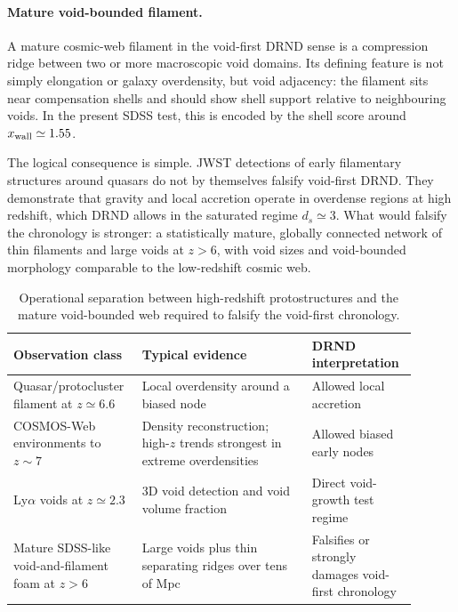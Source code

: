 \documentclass[11pt,a4paper]{article}
\begin{document}
\paragraph{Mature void-bounded filament.}
A mature cosmic-web filament in the void-first DRND sense is a compression ridge between two or more macroscopic void domains. Its defining feature is not simply elongation or galaxy overdensity, but void adjacency: the filament sits near compensation shells and should show shell support relative to neighbouring voids. In the present SDSS test, this is encoded by the shell score around $x_{\rm wall}\simeq1.55$.

The logical consequence is simple. JWST detections of early filamentary structures around quasars do not by themselves falsify void-first DRND. They demonstrate that gravity and local accretion operate in overdense regions at high redshift, which DRND allows in the saturated regime $d_s\simeq3$. What would falsify the chronology is stronger: a statistically mature, globally connected network of thin filaments and large voids at $z>6$, with void sizes and void-bounded morphology comparable to the low-redshift cosmic web.

\begin{table}[H]
\centering
\caption{Operational separation between high-redshift protostructures and the mature void-bounded web required to falsify the void-first chronology.}
\small
\begin{tabular}{p{0.26\linewidth}p{0.40\linewidth}p{0.24\linewidth}}
\toprule
Observation class & Typical evidence & DRND interpretation \\
\midrule
Quasar/protocluster filament at $z\simeq6.6$ & Local overdensity around a biased node \cite{wang2023} & Allowed local accretion \\
COSMOS-Web environments to $z\sim7$ & Density reconstruction; high-$z$ trends strongest in extreme overdensities \cite{hatamnia2026} & Allowed biased early nodes \\
Ly$\alpha$ voids at $z\simeq2.3$ & 3D void detection and void volume fraction \cite{krolewski2018} & Direct void-growth test regime \\
Mature SDSS-like void-and-filament foam at $z>6$ & Large voids plus thin separating ridges over tens of Mpc & Falsifies or strongly damages void-first chronology \\
\bottomrule
\end{tabular}
\normalsize
\end{table}
\end{document}
